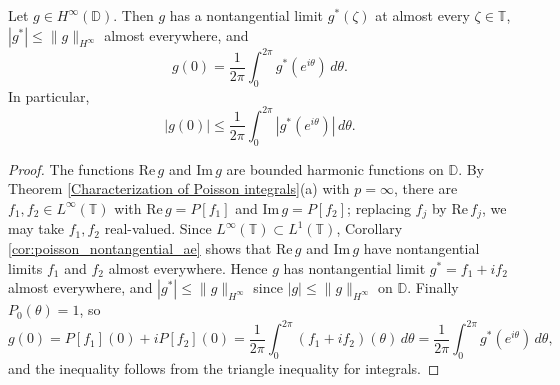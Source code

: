 \begin{lemma}\label{lem:bounded_analytic_boundary_value}
Let $g\in H^\infty(\mathbb{D})$. Then $g$ has a nontangential limit $g^*(\zeta)$ at almost
every $\zeta\in\mathbb{T}$, $|g^*|\leq\|g\|_{H^\infty}$ almost everywhere, and
\begin{equation*}
  g(0)=\frac{1}{2\pi}\int_0^{2\pi}g^*(e^{i\theta})\,d\theta.
\end{equation*}
In particular,
\begin{equation*}
  |g(0)|\leq\frac{1}{2\pi}\int_0^{2\pi}|g^*(e^{i\theta})|\,d\theta.
\end{equation*}
\end{lemma}
\begin{proof}
The functions $\text{Re}\, g$ and $\text{Im}\, g$ are bounded harmonic functions on $\mathbb{D}$. By
Theorem \ref{Characterization of Poisson integrals}(a) with $p=\infty$, there are
$f_1,f_2\in L^\infty(\mathbb{T})$ with $\text{Re}\, g=P[f_1]$ and $\text{Im}\, g=P[f_2]$; replacing $f_j$
by $\text{Re}\, f_j$, we may take $f_1,f_2$ real-valued. Since $L^\infty(\mathbb{T})\subset
L^1(\mathbb{T})$, Corollary \ref{cor:poisson_nontangential_ae} shows that $\text{Re}\, g$ and
$\text{Im}\, g$ have nontangential limits $f_1$ and $f_2$ almost everywhere. Hence $g$ has
nontangential limit $g^*=f_1+if_2$ almost everywhere, and $|g^*|\leq\|g\|_{H^\infty}$
since $|g|\leq\|g\|_{H^\infty}$ on $\mathbb{D}$. Finally $P_0(\theta)=1$, so
\begin{equation*}
  g(0)=P[f_1](0)+iP[f_2](0)=\frac{1}{2\pi}\int_0^{2\pi}(f_1+if_2)(\theta)\,d\theta
  =\frac{1}{2\pi}\int_0^{2\pi}g^*(e^{i\theta})\,d\theta,
\end{equation*}
and the inequality follows from the triangle inequality for integrals.
\end{proof}

